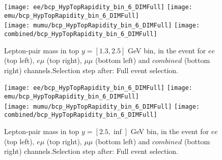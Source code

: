 \clearpage
\newpage
\begin{figure}
  \texttt{[image: ee/bcp\_HypTopRapidity\_bin\_6\_DIMFull]}
  \texttt{[image: emu/bcp\_HypTopRapidity\_bin\_6\_DIMFull]}\\
  \texttt{[image: mumu/bcp\_HypTopRapidity\_bin\_6\_DIMFull]}
  \texttt{[image: combined/bcp\_HypTopRapidity\_bin\_6\_DIMFull]}
\caption{Lepton-pair mass in top $y = [1.3,2.5]$ GeV bin, in the event for $ee$ (top left), $e\mu$ (top right), $\mu\mu$ (bottom left) and $combined$ (bottom right) channels.\newline Selection step after: Full event selection.}
\end{figure}

\clearpage
\newpage
\begin{figure}
  \texttt{[image: ee/bcp\_HypTopRapidity\_bin\_6\_DIMFull]}
  \texttt{[image: emu/bcp\_HypTopRapidity\_bin\_6\_DIMFull]}\\
  \texttt{[image: mumu/bcp\_HypTopRapidity\_bin\_6\_DIMFull]}
  \texttt{[image: combined/bcp\_HypTopRapidity\_bin\_6\_DIMFull]}
\caption{Lepton-pair mass in top $y = [2.5,\inf]$ GeV bin, in the event for $ee$ (top left), $e\mu$ (top right), $\mu\mu$ (bottom left) and $combined$ (bottom right) channels.\newline Selection step after: Full event selection.}
\end{figure}

\clearpage
\newpage







% 
% 

